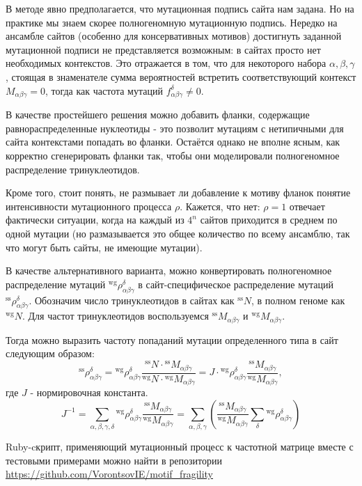 \documentclass[a4paper]{article}
\begin{document}
В методе явно предполагается, что мутационная подпись сайта нам задана. Но на практике мы знаем скорее полногеномную мутационную подпись. Нередко на ансамбле сайтов (особенно для консервативных мотивов) достигнуть заданной мутационной подписи не представляется возможным: в сайтах просто нет необходимых контекстов. Это отражается в том, что для некоторого набора $\alpha, \beta, \gamma$, стоящая в знаменателе сумма вероятностей встретить соответствующий контекст $M_{\alpha\beta\gamma} = 0$, тогда как частота мутаций $f_{\alpha\beta\gamma}^{\delta}\ne 0$.

В качестве простейшего решения можно добавить фланки, содержащие равнораспределенные нуклеотиды - это позволит мутациям с нетипичными для сайта контекстами попадать во фланки. Остаётся однако не вполне ясным, как корректно сгенерировать фланки так, чтобы они моделировали полногеномное распределение тринуклеотидов.

Кроме того, стоит понять, не размывает ли добавление к мотиву фланок понятие интенсивности мутационного процесса $\rho$. Кажется, что нет: $\rho=1$ отвечает фактически ситуации, когда на каждый из $4^n$ сайтов приходится в среднем по одной мутации (но размазывается это общее количество по всему ансамблю, так что могут быть сайты, не имеющие мутации).

В качестве альтернативного варианта, можно конвертировать полногеномное распределение мутаций ${}^{\textrm{wg}}\rho_{\alpha\beta\gamma}^{\delta}$ в сайт-специфическое распределение мутаций ${}^{\textrm{ss}}\rho_{\alpha\beta\gamma}^{\delta}$. Обозначим число тринуклеотидов в сайтах как ${}^{\textrm{ss}}N$, в полном геноме как ${}^{\textrm{wg}}N$. Для частот тринуклеотидов воспользуемся ${}^{\textrm{ss}}M_{\alpha\beta\gamma}$ и ${}^{\textrm{wg}}M_{\alpha\beta\gamma}$.

Тогда можно выразить частоту попаданий мутации определенного типа в сайт следующим образом:
$${}^{\textrm{ss}}\rho_{\alpha\beta\gamma}^{\delta} = {}^{\textrm{wg}}\rho_{\alpha\beta\gamma}^{\delta} \frac{{}^{\textrm{ss}}N \cdot {}^{\textrm{ss}}M_{\alpha\beta\gamma}}{{}^{\textrm{wg}}N \cdot {}^{\textrm{wg}}M_{\alpha\beta\gamma}} = J\cdot{}^{\textrm{wg}}\rho_{\alpha\beta\gamma}^{\delta} \frac{{}^{\textrm{ss}}M_{\alpha\beta\gamma}}{{}^{\textrm{wg}}M_{\alpha\beta\gamma}},$$
где $J$ - нормировочная константа.
$$J^{-1} = \sum_{\alpha,\beta,\gamma,\delta}{}^{\textrm{wg}}\rho_{\alpha\beta\gamma}^{\delta} \frac{{}^{\textrm{ss}}M_{\alpha\beta\gamma}}{{}^{\textrm{wg}}M_{\alpha\beta\gamma}} = \sum_{\alpha,\beta,\gamma}\left(\frac{{}^{\textrm{ss}}M_{\alpha\beta\gamma}}{{}^{\textrm{wg}}M_{\alpha\beta\gamma}}\sum_{\delta}{}^{\textrm{wg}}\rho_{\alpha\beta\gamma}^{\delta}\right)$$

Ruby-cкрипт, применяющий мутационный процесс к частотной матрице вместе с тестовыми примерами можно найти в репозитории \url{https://github.com/VorontsovIE/motif_fragility}
\end{document}
